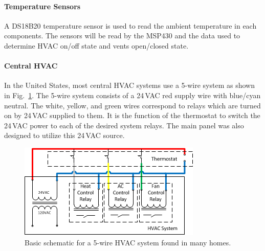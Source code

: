 \paragraph{Temperature Sensors}
\label{temp_sensors}
A DS18B20 temperature sensor is used to read the ambient temperature in each components. The sensors will be read by the MSP430 and the data used to determine HVAC on/off state and vents open/closed state.

\paragraph{Central HVAC}
 In the United States, most central HVAC systems use a 5-wire system as shown in Fig.~\ref{fig:5wire}.  The 5-wire system consists of a 24\,VAC red supply wire with blue/cyan neutral.  The white, yellow, and green wires correspond to relays which are turned on by 24\,VAC supplied to them. It is the function of the thermostat to switch the 24\,VAC power to each of the desired system relays.  
The main panel was also designed to utilize this 24\,VAC source.

\begin{figure}
\centering
\includegraphics[width=.99\textwidth]{5wire.png}
\caption{Basic schematic for a 5-wire HVAC system found in many homes.}
\label{fig:5wire}
\end{figure}

